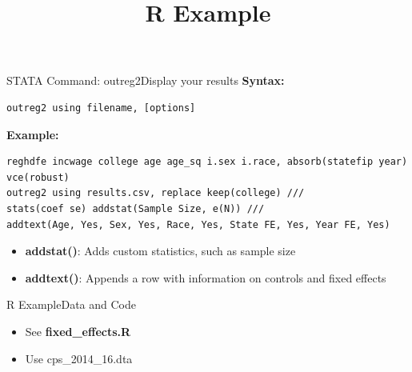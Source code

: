 \documentclass[dvipsnames,hyperref={pdfpagelabels=false}]{beamer}
\begin{document}
\begin{frame}[fragile]{STATA Command: outreg2}{Display your results}
	\noindent\textbf{Syntax:}
\begin{lstlisting}
outreg2 using filename, [options]
\end{lstlisting}

\noindent\textbf{Example:}
\begin{lstlisting}
reghdfe incwage college age age_sq i.sex i.race, absorb(statefip year) vce(robust)
outreg2 using results.csv, replace keep(college) ///
stats(coef se) addstat(Sample Size, e(N)) ///
addtext(Age, Yes, Sex, Yes, Race, Yes, State FE, Yes, Year FE, Yes)
\end{lstlisting}
	
	\begin{itemize}
	
		\item \textbf{addstat()}: Adds custom statistics, such as sample size
		\vspace{0.2cm}
		\item \textbf{addtext()}: Appends a row with information on controls and fixed effects
	\end{itemize}
\end{frame}




\title[]
{R Example}

\author
{}

\institute{}



\date
{}

\begin{frame}{}
	\titlepage
\end{frame}

\begin{frame}{R Example}{Data and Code}
	\begin{itemize}
		\item See \textbf{fixed\_effects.R}
		\vspace{0.2cm}
		\item Use cps\_2014\_16.dta
	\end{itemize}
\end{frame}
\end{document}
